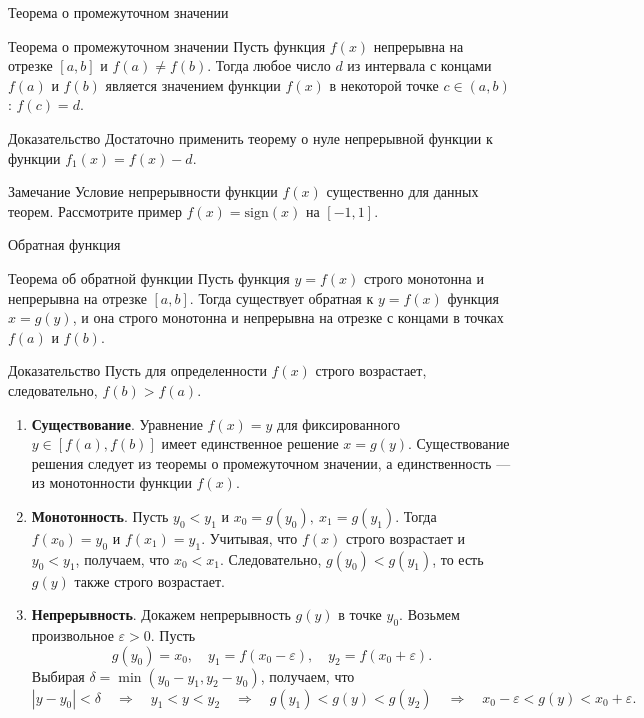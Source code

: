 \documentclass[8pt]{beamer}
\begin{document}
\begin{frame}{Теорема о промежуточном значении}
\begin{block}{Теорема о промежуточном значении}
Пусть функция $f(x)$ непрерывна на отрезке $[a,b]$ и $f(a)\ne f(b)$. 
Тогда любое число $d$ из интервала с концами $f(a)$ и $f(b)$ является значением функции $f(x)$ в некоторой точке $c\in(a,b)$: $f(c)=d$.
\end{block}
\begin{block}{Доказательство}
Достаточно применить теорему о нуле непрерывной функции к функции $f_1(x)=f(x)-d$.
\end{block}
\begin{block}{Замечание}
Условие непрерывности функции $f(x)$ существенно для данных теорем. Рассмотрите пример $f(x)=\mathrm{sign}(x)$ на $[-1,1]$.
\end{block}
\end{frame}

\begin{frame}{Обратная функция}

\begin{block}{Теорема об обратной функции}
Пусть функция $y=f(x)$ строго монотонна и непрерывна на отрезке $[a,b]$. Тогда существует обратная к $y=f(x)$ функция $x=g(y)$, и она строго монотонна и непрерывна на отрезке с концами в точках $f(a)$ и $f(b)$.
\end{block}
\begin{block}{Доказательство}
Пусть для определенности $f(x)$ строго возрастает, следовательно, $f(b)>f(a)$.
\begin{enumerate}
\item {\bf Существование}. Уравнение $f(x)=y$ для фиксированного $y\in[f(a),f(b)]$ имеет единственное решение $x=g(y)$. Существование решения следует из теоремы о промежуточном значении, а единственность --- из монотонности функции $f(x)$.
\item {\bf Монотонность}. Пусть $ y_0<y_1$ и $x_0=g(y_0),\ x_1=g(y_1)$. Тогда $f(x_0)=y_0$ и $f(x_1)=y_1$. Учитывая, что $f(x)$ строго возрастает и $y_0<y_1$, получаем, что $x_0<x_1$. Следовательно, $g(y_0)<g(y_1)$, то есть $g(y)$ также строго возрастает.
\item {\bf Непрерывность}. Докажем непрерывность $g(y)$ в точке $y_0$. Возьмем произвольное $\varepsilon>0$. Пусть 
$$g(y_0)=x_0, \quad y_1=f(x_0-\varepsilon),\quad y_2=f(x_0+\varepsilon).$$
Выбирая $\delta= \min(y_0-y_1,y_2-y_0)$, получаем, что
$$
|y-y_0|<\delta \quad\Rightarrow\quad y_1<y<y_2 \quad\Rightarrow\quad
g(y_1)<g(y)<g(y_2) \quad\Rightarrow\quad x_0-\varepsilon<g(y)<x_0+\varepsilon.
$$
\end{enumerate}
\end{block}
\end{frame}
\end{document}
